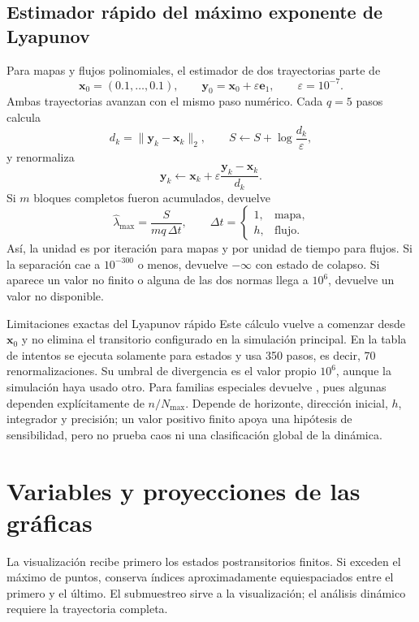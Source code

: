 \subsection{Estimador rápido del máximo exponente de Lyapunov}

Para mapas y flujos polinomiales, el estimador de dos trayectorias parte de
\[
 \mathbf{x}_0=(0.1,\ldots,0.1),\qquad
 \mathbf{y}_0=\mathbf{x}_0+\varepsilon\mathbf{e}_1,\qquad
 \varepsilon=10^{-7}.
\]
Ambas trayectorias avanzan con el mismo paso numérico. Cada \(q=5\) pasos calcula
\[
 d_k=\|\mathbf{y}_k-\mathbf{x}_k\|_2,\qquad
 S\leftarrow S+\log\frac{d_k}{\varepsilon},
\]
y renormaliza
\[
 \mathbf{y}_k\leftarrow
 \mathbf{x}_k+\varepsilon
 \frac{\mathbf{y}_k-\mathbf{x}_k}{d_k}.
\]
Si \(m\) bloques completos fueron acumulados, devuelve
\[
 \widehat{\lambda}_{\max}=
 \frac{S}{m q\,\Delta t},\qquad
 \Delta t=
 \begin{cases}
 1,&\text{mapa},\\
 h,&\text{flujo}.
 \end{cases}
\]
Así, la unidad es por iteración para mapas y por unidad de tiempo para flujos.
Si la separación cae a \(10^{-300}\) o menos, devuelve
\(-\infty\) con estado de colapso. Si aparece un valor no finito o alguna de las
dos normas llega a \(10^6\), devuelve un valor no disponible.

\begin{idea}{Limitaciones exactas del Lyapunov rápido}
Este cálculo vuelve a comenzar desde \(\mathbf{x}_0\) y no elimina el transitorio
configurado en la simulación principal. En la tabla de intentos se ejecuta
solamente para estados  y usa 350 pasos, es decir,
70 renormalizaciones. Su umbral de divergencia es el valor propio \(10^6\), aunque
la simulación haya usado otro. Para familias especiales devuelve
, pues algunas dependen explícitamente de
\(n/N_{\max}\). Depende de horizonte, dirección inicial, \(h\), integrador y
precisión; un valor positivo finito apoya una hipótesis de sensibilidad, pero no
prueba caos ni una clasificación global de la dinámica.
\end{idea}

\section{Variables y proyecciones de las gráficas}

La visualización recibe primero los estados postransitorios finitos. Si exceden el
máximo de puntos, conserva índices aproximadamente equiespaciados entre el primero
y el último. El submuestreo sirve a la visualización; el análisis dinámico requiere
la trayectoria completa.

